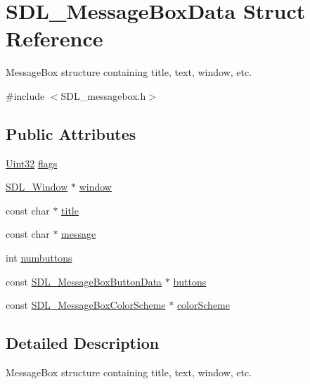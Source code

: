 \hypertarget{struct_s_d_l___message_box_data}{}\section{S\+D\+L\+\_\+\+Message\+Box\+Data Struct Reference}
\label{struct_s_d_l___message_box_data}


Message\+Box structure containing title, text, window, etc.  




{\ttfamily \#include $<$S\+D\+L\+\_\+messagebox.\+h$>$}

\subsection*{Public Attributes}
\begin{DoxyCompactItemize}
\item 
\hyperlink{_s_d_l__stdinc_8h_add440eff171ea5f55cb00c4a9ab8672d}{Uint32} \hyperlink{struct_s_d_l___message_box_data_a113d016f760bf4e4156b0f376358d6a0}{flags}
\item 
\hyperlink{_s_d_l__video_8h_a55a196c7d3b8497538632c79ae1e6392}{S\+D\+L\+\_\+\+Window} $\ast$ \hyperlink{struct_s_d_l___message_box_data_a5c333bc93705c66068e140bc28daedcb}{window}
\item 
const char $\ast$ \hyperlink{struct_s_d_l___message_box_data_a93ceeafeed20b553ad4c86c9be37f117}{title}
\item 
const char $\ast$ \hyperlink{struct_s_d_l___message_box_data_ada6ae208a1f85adabbd7a7a08ca609c8}{message}
\item 
int \hyperlink{struct_s_d_l___message_box_data_a133f4fef549cc0cb14b799af35f3dc5a}{numbuttons}
\item 
const \hyperlink{struct_s_d_l___message_box_button_data}{S\+D\+L\+\_\+\+Message\+Box\+Button\+Data} $\ast$ \hyperlink{struct_s_d_l___message_box_data_a265e47aab749e384661ae91d3e11e0db}{buttons}
\item 
const \hyperlink{struct_s_d_l___message_box_color_scheme}{S\+D\+L\+\_\+\+Message\+Box\+Color\+Scheme} $\ast$ \hyperlink{struct_s_d_l___message_box_data_a18744865a3e89e260db5f01aee579e35}{color\+Scheme}
\end{DoxyCompactItemize}


\subsection{Detailed Description}
Message\+Box structure containing title, text, window, etc. 

